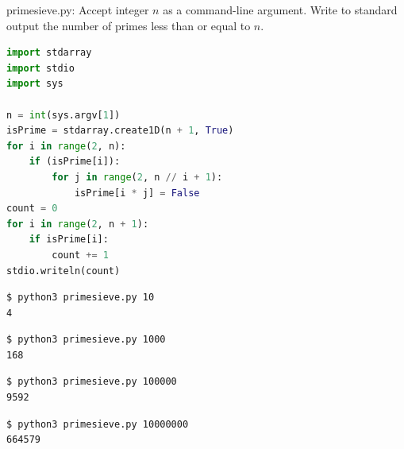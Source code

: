 \documentclass[8pt,a4paper,compress]{beamer}
\begin{document}
\begin{frame}[fragile]
\pause

\begin{framed}
\tiny primesieve.py: Accept integer $n$ as a command-line argument. Write to standard output the number of primes less than or equal to $n$.
\end{framed}

\begin{minipage}{160pt}
\begin{lstlisting}[language=Python,style=focusin]
import stdarray
import stdio
import sys

n = int(sys.argv[1])
isPrime = stdarray.create1D(n + 1, True)
for i in range(2, n):
    if (isPrime[i]):
        for j in range(2, n // i + 1):
            isPrime[i * j] = False
count = 0
for i in range(2, n + 1):
    if isPrime[i]:
        count += 1
stdio.writeln(count)
\end{lstlisting}

\end{minipage}%
\begin{minipage}{140pt}
\hfill {}
\end{minipage}

\pause\bigskip

\begin{lstlisting}[language={},style=focusin]
$ python3 primesieve.py 10
4
\end{lstlisting}

\pause\bigskip

\begin{lstlisting}[language={},style=focusin]
$ python3 primesieve.py 1000
168
\end{lstlisting}

\pause\bigskip

\begin{lstlisting}[language={},style=focusin]
$ python3 primesieve.py 100000
9592
\end{lstlisting}

\pause\bigskip

\begin{lstlisting}[language={},style=focusin]
$ python3 primesieve.py 10000000
664579
\end{lstlisting}
\end{frame}
\end{document}
